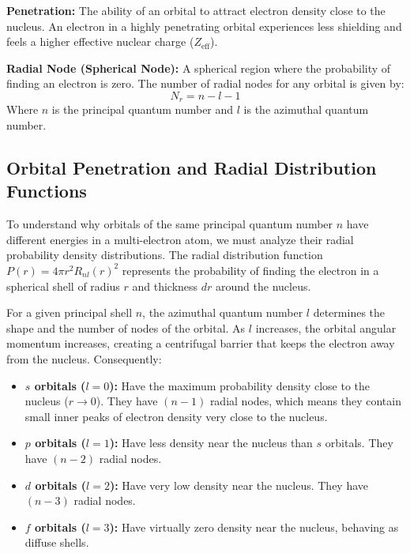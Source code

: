 \documentclass[12pt,a4paper]{article}
\begin{document}
\begin{tcolorbox}[defbox, title={Definitions: Penetration and Radial Nodes}]
  \textbf{Penetration:} The ability of an orbital to attract electron density close to the nucleus. An electron in a highly penetrating orbital experiences less shielding and feels a higher effective nuclear charge ($Z_{\text{eff}}$).
  \par\vspace{4pt}
  \textbf{Radial Node (Spherical Node):} A spherical region where the probability of finding an electron is zero. The number of radial nodes for any orbital is given by:
  \[ N_r = n - l - 1 \]
  Where $n$ is the principal quantum number and $l$ is the azimuthal quantum number.
\end{tcolorbox}

\subsection{Orbital Penetration and Radial Distribution Functions}
To understand why orbitals of the same principal quantum number $n$ have different energies in a multi-electron atom, we must analyze their radial probability density distributions. The radial distribution function $P(r) = 4\pi r^2 R_{nl}(r)^2$ represents the probability of finding the electron in a spherical shell of radius $r$ and thickness $dr$ around the nucleus.

For a given principal shell $n$, the azimuthal quantum number $l$ determines the shape and the number of nodes of the orbital. As $l$ increases, the orbital angular momentum increases, creating a centrifugal barrier that keeps the electron away from the nucleus. Consequently:
\begin{itemize}[leftmargin=*, itemsep=2pt]
  \item \textbf{$s$ orbitals ($l=0$):} Have the maximum probability density close to the nucleus ($r \to 0$). They have $(n-1)$ radial nodes, which means they contain small inner peaks of electron density very close to the nucleus.
  \item \textbf{$p$ orbitals ($l=1$):} Have less density near the nucleus than $s$ orbitals. They have $(n-2)$ radial nodes.
  \item \textbf{$d$ orbitals ($l=2$):} Have very low density near the nucleus. They have $(n-3)$ radial nodes.
  \item \textbf{$f$ orbitals ($l=3$):} Have virtually zero density near the nucleus, behaving as diffuse shells.
\end{itemize}
\end{document}
